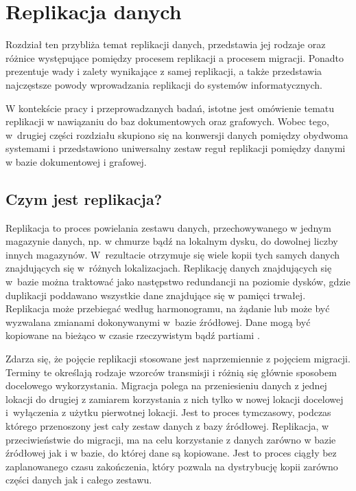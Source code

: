 \documentclass[a4paper,twoside,12pt]{book}
\begin{document}
\chapter{Replikacja danych}

Rozdział ten przybliża temat replikacji danych, przedstawia jej rodzaje oraz różnice występujące pomiędzy procesem replikacji a procesem migracji. Ponadto prezentuje wady i zalety wynikające z samej replikacji, a także przedstawia najczęstsze powody wprowadzania replikacji do systemów informatycznych.

W kontekście pracy i przeprowadzanych badań, istotne jest omówienie tematu replikacji w nawiązaniu do baz dokumentowych oraz grafowych. Wobec tego, w~drugiej części rozdziału skupiono się na konwersji danych pomiędzy obydwoma systemami i przedstawiono uniwersalny zestaw reguł replikacji pomiędzy danymi w bazie dokumentowej i grafowej.

\section{Czym jest replikacja?} 

Replikacja to proces powielania zestawu danych, przechowywanego w jednym magazynie danych, np. w chmurze bądź na lokalnym dysku, do dowolnej liczby innych magazynów. W~rezultacie otrzymuje się wiele kopii tych samych danych znajdujących się w~różnych lokalizacjach. Replikację danych znajdujących się w~bazie można traktować jako następstwo redundancji na poziomie dysków, gdzie duplikacji poddawano wszystkie dane znajdujące się w pamięci trwałej. Replikacja może przebiegać według harmonogramu, na żądanie lub może być wyzwalana zmianami dokonywanymi w~bazie źródłowej. Dane mogą być kopiowane na bieżąco w czasie rzeczywistym bądź partiami \cite{bib:database-replication-book}. 

Zdarza się, że pojęcie replikacji stosowane jest naprzemiennie z pojęciem migracji. Terminy te określają rodzaje wzorców transmisji i różnią się głównie sposobem docelowego wykorzystania. Migracja polega na przeniesieniu danych z jednej lokacji do drugiej z zamiarem korzystania z nich tylko w nowej lokacji docelowej i~wyłączenia z użytku pierwotnej lokacji. Jest to proces tymczasowy, podczas którego przenoszony jest cały zestaw danych z bazy źródłowej. Replikacja, w przeciwieństwie do migracji, ma na celu korzystanie z danych zarówno w bazie źródłowej jak i w bazie, do której dane są kopiowane. Jest to proces ciągły bez zaplanowanego czasu zakończenia, który pozwala na dystrybucję kopii zarówno części danych jak i całego zestawu.
\end{document}

